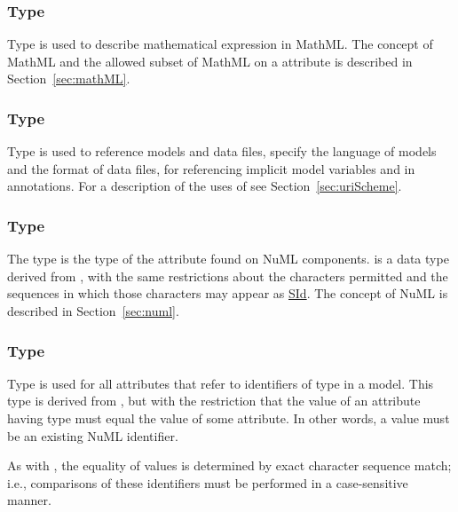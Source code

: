 \subsubsection[\element{MathML}]{Type }
\label{type:mathml}
Type  is used to describe mathematical expression in MathML. The concept of MathML and the allowed subset of MathML on a  attribute is described in Section~\ref{sec:mathML}.

\subsubsection[\element{anyURI}]{Type }
\label{type:anyURI}
Type  is used to reference models and data files, specify the language of models and the format of data files, for referencing implicit model variables and in annotations. For a description of the uses of  see Section~\ref{sec:uriScheme}.

\subsubsection[\element{NuMLSId}]{Type }
\label{type:numlsid}
The type  is the type of the  attribute found on NuML components.  is a data type derived from \hyperref[type:sid]{}, with the same restrictions about the characters permitted and the sequences in which those characters may appear as \hyperref[type:sid]{SId}. The concept of NuML is described in Section~\ref{sec:numl}.

\subsubsection[\element{NuMLSIdRef}]{Type }
\label{type:numlsidref}
Type  is used for all attributes that refer to identifiers of type \hyperref[type:numlsid]{} in a model. This type is derived from \hyperref[type:numlsid]{}, but with the restriction that the value of an attribute having type  must equal the value of some \hyperref[type:numlsid]{} attribute. In other words, a  value must be an existing NuML identifier.

As with \hyperref[type:numlsid]{}, the equality of  values is determined by exact character sequence match; i.e., comparisons of these identifiers must be performed in a case-sensitive manner.


